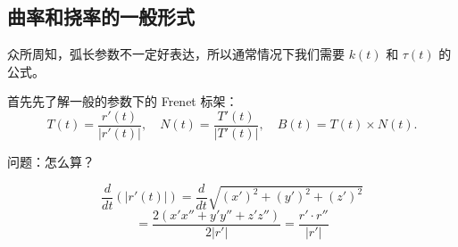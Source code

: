 \documentclass[lang=cn,10pt,thmcnt=section]{elegantbook}
\begin{document}
\subsection{曲率和挠率的一般形式}
众所周知，弧长参数不一定好表达，所以通常情况下我们需要 $k(t)$ 和 $\tau(t)$ 的公式。

首先先了解一般的参数下的 Frenet 标架：
\[
T(t) = \frac{r'(t)}{|r'(t)|}, \quad N(t) = \frac{T'(t)}{|T'(t)|}, \quad B(t) = T(t) \times N(t).
\]

问题：怎么算？
\begin{theorem}[Frenet标架的导数]
    \[
    \frac{d}{dt}(|r'(t)|) = \frac{d}{dt}\sqrt{(x')^2 + (y')^2 + (z')^2}
    \]
    \[
    = \frac{2(x'x'' + y'y'' + z'z'')}{2|r'|} = \frac{r' \cdot r''}{|r'|}
    \]
    \end{theorem}
    
\end{document}
